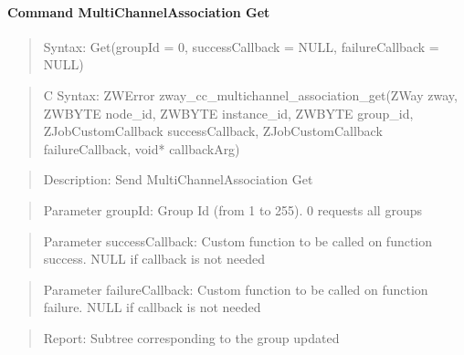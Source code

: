 \paragraph{Command MultiChannelAssociation Get}
\begin{quote}Syntax: Get(groupId = 0, successCallback = NULL, failureCallback = NULL)\end{quote}
\begin{quote}C Syntax: ZWError zway\_cc\_multichannel\_association\_get(ZWay zway, ZWBYTE node\_id, ZWBYTE instance\_id, ZWBYTE group\_id, ZJobCustomCallback successCallback, ZJobCustomCallback failureCallback, void* callbackArg)\end{quote}
\begin{quote}Description: Send MultiChannelAssociation Get\end{quote}
\begin{quote}Parameter groupId: Group Id (from 1 to 255). 0 requests all groups\end{quote}
\begin{quote}Parameter successCallback: Custom function to be called on function success. NULL if callback is not needed\end{quote}
\begin{quote}Parameter failureCallback: Custom function to be called on function failure. NULL if callback is not needed\end{quote}
\begin{quote}Report: Subtree corresponding to the group updated\end{quote}

